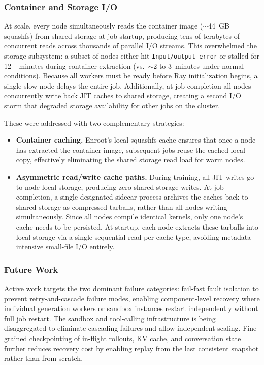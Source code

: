 \subsubsection*{Container and Storage I/O}

At scale, every node simultaneously reads the container image ($\sim$44~GB squashfs) from 
shared storage at job startup, producing tens of terabytes of concurrent reads across 
thousands of parallel I/O streams. This overwhelmed the storage subsystem: a subset of nodes 
either hit \texttt{Input/output error} or stalled for 12+ minutes during container 
extraction (vs.\ $\sim$2 to 3~minutes under normal conditions). Because all workers must be 
ready before Ray initialization begins, a single slow node delays the entire job. 
Additionally, at job completion all nodes concurrently write back JIT caches to shared 
storage, creating a second I/O storm that degraded storage availability for other jobs on 
the cluster.

These were addressed with two complementary strategies:

\begin{itemize}
  \item \textbf{Container caching.} Enroot's local squashfs cache ensures that once a node 
    has extracted the container image, subsequent jobs reuse the cached local copy, 
    effectively eliminating the shared storage read load for warm nodes.

  \item \textbf{Asymmetric read/write cache paths.} During training, all JIT writes go to 
    node-local storage, producing zero shared storage writes. At job completion, a single 
    designated sidecar process archives the caches back to shared storage as compressed 
    tarballs, rather than all nodes writing simultaneously. Since all nodes compile identical 
    kernels, only one node's cache needs to be persisted. At startup, each node extracts 
    these tarballs into local storage via a single sequential read per cache type, avoiding 
    metadata-intensive small-file I/O entirely.
\end{itemize}

\subsubsection{Future Work}
Active work targets the two dominant failure categories: fail-fast fault isolation to prevent retry-and-cascade failure modes, enabling component-level recovery where individual generation workers or sandbox instances restart independently without full job restart. The sandbox and tool-calling infrastructure is being disaggregated to eliminate cascading failures and allow independent scaling. Fine-grained checkpointing of in-flight rollouts, KV cache, and conversation state further reduces recovery cost by enabling replay from the last consistent snapshot rather than from scratch.